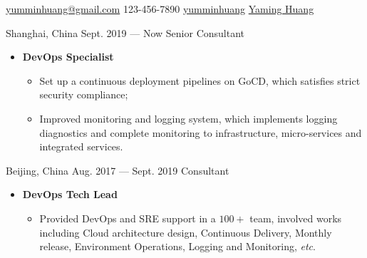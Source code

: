 \documentclass{resume}
\begin{document}
{\href{mailto:yumminhuang@gmail.com}{yumminhuang@gmail.com}}
{123-456-7890}
{\href{https://github.com/yumminhuang}{yumminhuang}}
{\href{https://www.linkedin.com/in/yaming-huang-6a09325b}{Yaming Huang}}
{}


\begin{body}
	{Shanghai, China}
	{Sept. 2019 --- Now}
	{Senior Consultant}
	\begin{itemize}
		\item {} \textbf{DevOps Specialist}
		\begin{itemize}[noitemsep,topsep=0pt]
			\item Set up a continuous deployment pipelines on GoCD, which satisfies strict security compliance;
			\item Improved monitoring and logging system, which implements logging diagnostics and complete monitoring to infrastructure, micro-services and integrated services.
		\end{itemize}
	\end{itemize}
	{Beijing, China}
	{Aug. 2017 --- Sept. 2019}
	{Consultant}
	\begin{itemize}
		\item {} \textbf{DevOps Tech Lead}
		\begin{itemize}[noitemsep,topsep=0pt]
			\item Provided DevOps and SRE support in a $100+$ team, involved works including Cloud architecture design, Continuous Delivery, Monthly release, Environment Operations, Logging and Monitoring, \textit{etc}.

\end{itemize}
\end{itemize}
\end{body}
\end{document}
